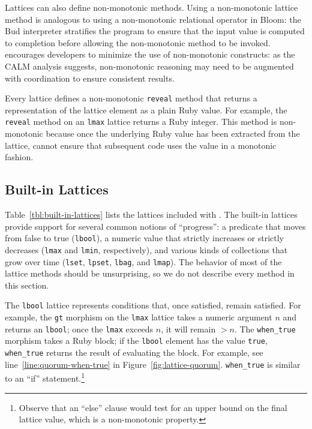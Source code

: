 Lattices can also define non-monotonic methods. Using a non-monotonic lattice
method is analogous to using a non-monotonic relational operator in Bloom: the
Bud interpreter stratifies the program to ensure that the input value is
computed to completion before allowing the non-monotonic method to be
invoked. \lang encourages developers to minimize the use of non-monotonic
constructs: as the CALM analysis suggests, non-monotonic reasoning may need to
be augmented with coordination to ensure consistent results.

Every lattice defines a non-monotonic \texttt{reveal} method that returns a
representation of the lattice element as a plain Ruby value. For example, the
\texttt{reveal} method on an \texttt{lmax} lattice returns a Ruby integer. This
method is non-monotonic because once the underlying Ruby value has been
extracted from the lattice, \lang cannot ensure that subsequent code uses the
value in a monotonic fashion.

\pagebreak
\subsection{Built-in Lattices}
\label{sec:lattice-built-ins}

Table~\ref{tbl:built-in-lattices} lists the lattices included with \lang. The
built-in lattices provide support for several common notions of ``progress'': a
predicate that moves from false to true (\texttt{lbool}), a numeric value that
strictly increases or strictly decreases (\texttt{lmax} and \texttt{lmin},
respectively), and various kinds of collections that grow over time
(\texttt{lset}, \texttt{lpset}, \texttt{lbag}, and \texttt{lmap}). The behavior
of most of the lattice methods should be unsurprising, so we do not describe
every method in this section.

The \texttt{lbool} lattice represents conditions that, once satisfied, remain
satisfied. For example, the \texttt{gt} morphism on the \texttt{lmax} lattice
takes a numeric argument $n$ and returns an \texttt{lbool}; once the
\texttt{lmax} exceeds $n$, it will remain $>n$. The \texttt{when\_true} morphism
takes a Ruby block; if the \texttt{lbool} element has the value \texttt{true},
\texttt{when\_true} returns the result of evaluating the block. For example, see
line~\ref{line:quorum-when-true} in
Figure~\ref{fig:lattice-quorum}. \texttt{when\_true} is similar to an ``if''
statement.\footnote{Observe that an ``else'' clause would test for an upper
  bound on the final lattice value, which is a non-monotonic property.}


